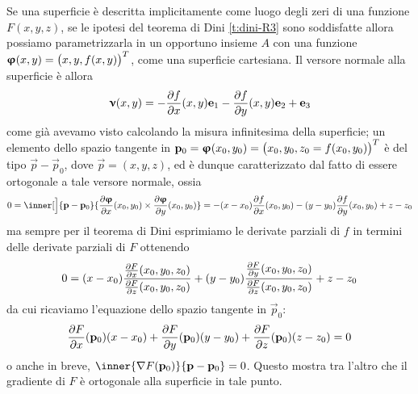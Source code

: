 \begin{osservazione} \label{o:spazio-tangente-superficie-implicita}
	Se una superficie è descritta implicitamente come luogo degli zeri di una funzione $F(x,y,z)$, se le ipotesi del teorema di Dini \ref{t:dini-R3} sono soddisfatte allora possiamo parametrizzarla in un opportuno insieme $A$ con una funzione $\bm{\upvarphi}(x,y)=\big(x,y,f(x,y)\big)^T$, come una superficie cartesiana.
	Il versore normale alla superficie è allora
	\begin{equation}
		\bm{\upnu}(x,y)=-\frac{\partial {f}}{\partial {x}}(x,y)\mathbf{e}_1-\frac{\partial {f}}{\partial {y}}(x,y)\mathbf{e}_2+\mathbf{e}_3
	\end{equation}
	come già avevamo visto calcolando la misura infinitesima della superficie; un elemento dello spazio tangente in $\mathbf{p}_0=\bm{\upvarphi}(x_0,y_0)=\big(x_0,y_0,z_0=f(x_0,y_0)\big)^T$ è del tipo $\vec p-\vec p_0$, dove $\vec p=(x,y,z)$, ed è dunque caratterizzato dal fatto di essere ortogonale a tale versore normale, ossia
	\begin{equation}
		0=\inner[\Big]{\vec p-\vec p_0}{\drp{\vphi}{x}(x_0,y_0)\times\drp{\vphi}{y}(x_0,y_0)}=
		-(x-x_0)\drp{f}{x}(x_0,y_0)-(y-y_0)\drp{f}{y}(x_0,y_0)+z-z_0
	\end{equation}
	ma sempre per il teorema di Dini esprimiamo le derivate parziali di $f$ in termini delle derivate parziali di $F$ ottenendo
	\begin{equation}
		0=(x-x_0)\dfrac{\frac{\partial {F}}{\partial {x}}(x_0,y_0,z_0)}{\frac{\partial {F}}{\partial {z}}(x_0,y_0,z_0)}+(y-y_0)\dfrac{\frac{\partial {F}}{\partial {y}}(x_0,y_0,z_0)}{\frac{\partial {F}}{\partial {z}}(x_0,y_0,z_0)}+z-z_0
	\end{equation}
	da cui ricaviamo l'equazione dello spazio tangente in $\vec p_0$:
	\begin{equation}
		\frac{\partial {F}}{\partial {x}}(\mathbf{p}_0)(x-x_0)+\frac{\partial {F}}{\partial {y}}(\mathbf{p}_0)(y-y_0)+\frac{\partial {F}}{\partial {z}}(\mathbf{p}_0)(z-z_0)=0
		\label{eq:spazio-tangente-superficie-implicita}
	\end{equation}
	o anche in breve, $\inner{\grad F(\vec p_0)}{\vec p-\vec p_0}=0$.
	Questo mostra tra l'altro che il gradiente di $F$ è ortogonale alla superficie in tale punto.
\end{osservazione}

